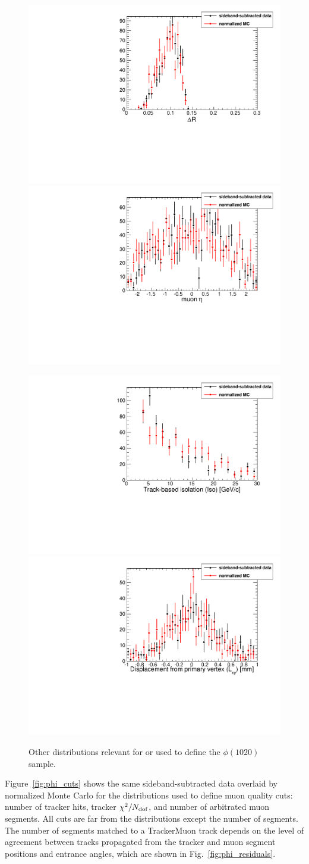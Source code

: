 \documentclass[12pt]{article}
\newcommand{\s}[1]{{\mbox{\scriptsize #1}}}
\begin{document}
\begin{figure}
\includegraphics[width=0.5\linewidth]{phi_dr.pdf}
\includegraphics[width=0.5\linewidth]{phi_eta.pdf}

\includegraphics[width=0.5\linewidth]{phi_iso.pdf}
\includegraphics[width=0.5\linewidth]{phi_lxy.pdf}

\caption{Other distributions relevant for or used to define the
  $\phi(1020)$ sample. \label{fig:phi_other}}
\end{figure}

Figure~\ref{fig:phi_cuts} shows the same sideband-subtracted data
overlaid by normalized Monte Carlo for the distributions used to
define muon quality cuts: number of tracker hits, tracker
$\chi^2/N_\s{dof}$, and number of arbitrated muon segments.  All cuts
are far from the distributions except the number of segments.  The
number of segments matched to a TrackerMuon track depends on the level
of agreement between tracks propagated from the tracker and muon
segment positions and entrance angles, which are shown in
Fig.~\ref{fig:phi_residuals}.
\end{document}
